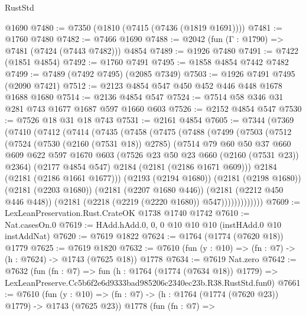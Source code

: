 \begin{lexlean}{RustStd}
\begin{coremodule}
    @1690
@7480 := @7350 (@1810 (@7415 (@7436 (@1819 @1691))))
@7481 := @1760 @7480
@7482 := @7466 @1690
@7488 := @2042 (fun (Γ : @1790) => @7481 (@7424 (@7443 @7482))) @4854
@7489 := @1926 @7480
@7491 := @7422 (@1851 @4854)
@7492 := @1760 @7491
@7495 := @1858 @4854 @7442 @7482
@7499 := @7489 (@7492 @7495) (@2085 @7349)
@7503 := @1926 @7491 @7495 (@2090 @7421)
@7512 := @2123 @4854 @547 @450 @452 @446 @448 @1678 @1688 @1680
@7514 := @2136 @4854 @547
@7524 := @7514 @58 @346 @31 @281 @743 @1677 @1687 @597 @1660 @603
@7526 := @2152 @4854 @547
@7530 := @7526 @18 @31 @18 @743
@7531 := @2161 @4854
@7605 := @7344
    (@7369
      (@7410
        (@7412
          (@7414
            (@7435
              (@7458
                (@7475
                  (@7488
                    (@7499
                      (@7503
                        (@7512
                          (@7524
                            (@7530 (@2160 (@7531 @18)) @2785)
                            (@7514
                              @79
                              @60
                              @50
                              @37
                              @660
                              @609
                              @622
                              @597
                              @1670
                              @603
                              (@7526 @23 @50 @23 @660 (@2160 (@7531 @23)) @2364)
                              (@2177 @4854 @547)
                              @2184
                              (@2181 (@2186 @1671 @609)))
                            @2184
                            (@2181 (@2186 @1661 @1677)))
                          (@2193 (@2194 @1680))
                          (@2181 (@2198 @1680))
                          (@2181 (@2203 @1680))
                          (@2181 (@2207 @1680 @446))
                          (@2181 (@2212 @450 @446 @448))
                          (@2181 (@2218 (@2219 (@2220 @1680)) @547)))))))))))))
@7609 := LexLeanPreservation.Rust.CrateOK @1738 @1740 @1742
@7610 := Nat.casesOn.{0}
@7619 := HAdd.hAdd.{0, 0, 0} @10 @10 @10 (instHAdd.{0} @10 instAddNat)
@7620 := @7619 @1822
@7624 := @1764 (@1774 (@7620 @18)) @1779
@7625 := @7619 @1820
@7632 := @7610 (fun (y : @10) => (fn : @7) -> (h : @7624) -> @1743 (@7625 @18)) @1778
@7634 := @7619 Nat.zero
@7642 := @7632
    (fun (fn : @7) =>
    fun (h : @1764 (@1774 (@7634 @18)) @1779) =>
    LexLeanPreserve.Cc5b6f2e6d9333bad985206c2340ec23b.R38.RustStd.fun0)
@7661 := @7610
    (fun (y : @10) => (fn : @7) -> (h : @1764 (@1774 (@7620 @23)) @1779) -> @1743 (@7625 @23))
    @1778
    (fun (fn : @7) =>

\end{coremodule}
\end{lexlean}
